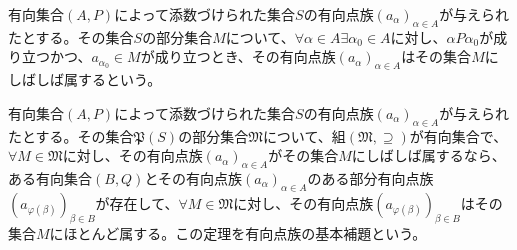 \documentclass[dvipdfmx]{jsarticle}
\begin{document}
\begin{dfn}
有向集合$(A,P)$によって添数づけられた集合$S$の有向点族$\left( a_{\alpha} \right)_{\alpha \in A}$が与えられたとする。その集合$S$の部分集合$M$について、$\forall\alpha \in A\exists\alpha_{0} \in A$に対し、$\alpha P\alpha_{0}$が成り立つかつ、$a_{\alpha_{0}} \in M$が成り立つとき、その有向点族$\left( a_{\alpha} \right)_{\alpha \in A}$はその集合$M$にしばしば属するという。
\end{dfn}
\begin{thm}[有向点族の基本補題]\label{8.1.9.1}
有向集合$(A,P)$によって添数づけられた集合$S$の有向点族$\left( a_{\alpha} \right)_{\alpha \in A}$が与えられたとする。その集合$\mathfrak{P}(S)$の部分集合$\mathfrak{M}$について、組$\left( \mathfrak{M, \supseteq} \right)$が有向集合で、$\forall M \in \mathfrak{M}$に対し、その有向点族$\left( a_{\alpha} \right)_{\alpha \in A}$がその集合$M$にしばしば属するなら、ある有向集合$(B,Q)$とその有向点族$\left( a_{\alpha} \right)_{\alpha \in A}$のある部分有向点族$\left( a_{\varphi(\beta)} \right)_{\beta \in B}$が存在して、$\forall M \in \mathfrak{M}$に対し、その有向点族$\left( a_{\varphi(\beta)} \right)_{\beta \in B}$はその集合$M$にほとんど属する。この定理を有向点族の基本補題という。
\end{thm}
\end{document}
